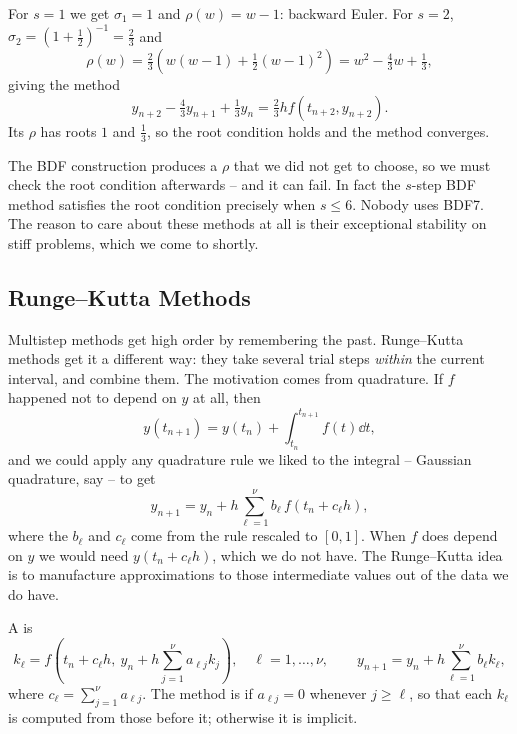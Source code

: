 \documentclass[a4paper]{scrartcl}
\begin{document}
\begin{example}
  For $s = 1$ we get $\sigma_1 = 1$ and $\rho(w) = w-1$: backward Euler. For $s = 2$, $\sigma_2 = (1 + \tfrac12)^{-1} = \tfrac23$ and
  $$
  \rho(w) = \tfrac23\left(w(w-1) + \tfrac12(w-1)^2\right) = w^2 - \tfrac43 w + \tfrac13,
  $$
  giving the method
  $$
  y_{n+2} - \tfrac43 y_{n+1} + \tfrac13 y_n = \tfrac23 h f(t_{n+2}, y_{n+2}).
  $$
  Its $\rho$ has roots $1$ and $\tfrac13$, so the root condition holds and the method converges.
\end{example}

\begin{remark}
  The BDF construction produces a $\rho$ that we did not get to choose, so we must check the root condition afterwards -- and it can fail. In fact the $s$-step BDF method satisfies the root condition precisely when $s \leq 6$. Nobody uses BDF7. The reason to care about these methods at all is their exceptional stability on stiff problems, which we come to shortly.
\end{remark}

\subsection{Runge--Kutta Methods}

Multistep methods get high order by remembering the past. Runge--Kutta methods get it a different way: they take several trial steps \emph{within} the current interval, and combine them. The motivation comes from quadrature. If $f$ happened not to depend on $y$ at all, then
$$
y(t_{n+1}) = y(t_n) + \int_{t_n}^{t_{n+1}}f(t)\dd t,
$$
and we could apply any quadrature rule we liked to the integral -- Gaussian quadrature, say -- to get
$$
y_{n+1} = y_n + h\sum_{\ell=1}^{\nu}b_\ell\, f(t_n + c_\ell h),
$$
where the $b_\ell$ and $c_\ell$ come from the rule rescaled to $[0,1]$. When $f$ does depend on $y$ we would need $y(t_n + c_\ell h)$, which we do not have. The Runge--Kutta idea is to manufacture approximations to those intermediate values out of the data we do have.

\begin{definition}
  A  is
  $$
  k_\ell = f\left(t_n + c_\ell h,\ y_n + h\sum_{j=1}^{\nu}a_{\ell j}k_j\right), \quad \ell = 1, \dots, \nu, \qquad y_{n+1} = y_n + h\sum_{\ell=1}^{\nu}b_\ell k_\ell,
  $$
  where $c_\ell = \sum_{j=1}^\nu a_{\ell j}$. The method is  if $a_{\ell j} = 0$ whenever $j \geq \ell$, so that each $k_\ell$ is computed from those before it; otherwise it is implicit.
\end{definition}
\end{document}

